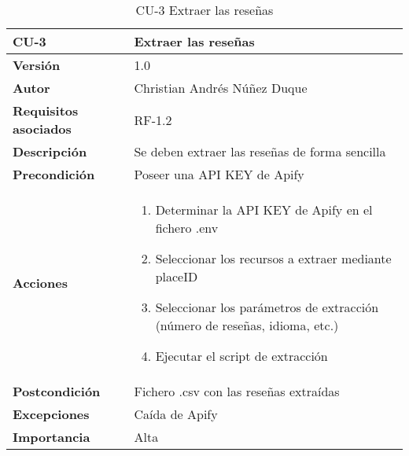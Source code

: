 \begin{table}[p]
	\centering
	\begin{tabularx}{\linewidth}{ p{} p{} }
		\toprule
		\textbf{CU-3}    & \textbf{Extraer las reseñas}\\
		\toprule
		\textbf{Versión}              & 1.0    \\
		\textbf{Autor}                & Christian Andrés Núñez Duque \\
		\textbf{Requisitos asociados} & RF-1.2 \\
		\textbf{Descripción}          & Se deben extraer las reseñas de forma sencilla \\
		\textbf{Precondición}         & Poseer una API KEY de Apify \\
		\textbf{Acciones}             &
		\begin{enumerate}
			\def\labelenumi{\arabic{enumi}.}
			\tightlist
			\item Determinar la API KEY de Apify en el fichero .env
			\item Seleccionar los recursos a extraer mediante placeID
			\item Seleccionar los parámetros de extracción (número de reseñas, idioma, etc.)
			\item Ejecutar el script de extracción
		\end{enumerate}\\
		\textbf{Postcondición}        & Fichero .csv con las reseñas extraídas \\
		\textbf{Excepciones}          & Caída de Apify \\
		\textbf{Importancia}          & Alta \\
		\bottomrule
	\end{tabularx}
	\caption{CU-3 Extraer las reseñas}
\end{table}

